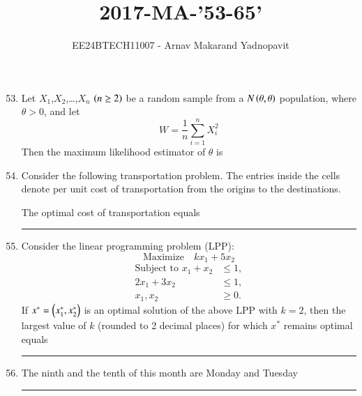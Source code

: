 \documentclass[journal,12pt,onecolumn]{IEEEtran}
\theoremstyle{remark}
\begin{document}
\title{2017-MA-'53-65'}
\author{EE24BTECH11007 - Arnav Makarand Yadnopavit}
\maketitle
\renewcommand{\thefigure}{\theenumi}
\renewcommand{\thetable}{\theenumi}
\begin{enumerate}
\setcounter{enumi}{52}
\item Let $X_1$,$X_2$,\dots,$X_n$ $\left(n\geq2\right)$ be a random sample from a $N\left(\theta,\theta\right)$ population, where $\theta>0$, and let 
\[
W=\frac{1}{n}\sum_{i=1}^n X_i^2
\]
Then the maximum likelihood estimator of $\theta$ is
\begin{enumerate}
\end{enumerate}
\item Consider the following transportation problem. The entries inside the cells denote per unit cost of transportation from the origins to the destinations.
\begin{figure}[H]
    \centering
    
\end{figure}
The optimal cost of transportation equals \rule{2cm}{0.15mm}
\item Consider the linear programming problem (LPP):
\[
\text{Maximize} \quad kx_1 + 5x_2
\]
\[
\begin{aligned}
    \text{Subject to } x_1 + x_2 &\leq 1,\\
    2x_1 + 3x_2 &\leq 1, \\
    x_1, x_2 &\geq 0.
\end{aligned}
\]
If $x^*=\left(x^*_1,x^*_2\right)$ is an optimal solution of the above LPP with $k=2$, then the largest value of $k$ (rounded to 2 decimal places) for which $x^*$ remains optimal equals \rule{2cm}{0.15mm} 
\item  The ninth and the tenth of this month are Monday and Tuesday \rule{2cm}{0.15mm}
\begin{enumerate}
\end{enumerate}
\end{enumerate}
\end{document}
